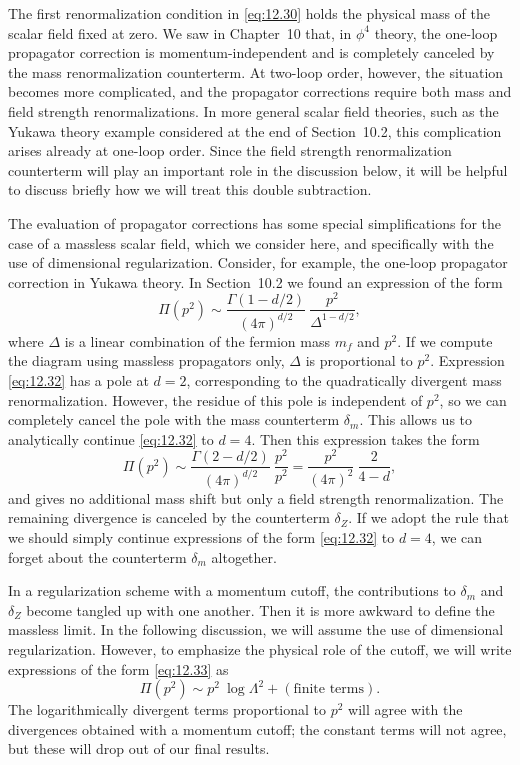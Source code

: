The first renormalization condition in \eqref{eq:12.30} holds the physical
mass of the scalar field fixed at zero.  We saw in Chapter~10 that, in
$\phi^4$ theory, the one-loop propagator correction is momentum-independent
and is completely canceled by the mass renormalization counterterm.  At
two-loop order, however, the situation becomes more complicated, and the
propagator corrections require both mass and field strength
renormalizations.  In more general scalar field theories, such as the Yukawa
theory example considered at the end of Section~10.2, this complication
arises already at one-loop order.  Since the field strength renormalization
counterterm will play an important role in the discussion below, it will be
helpful to discuss briefly how we will treat this double subtraction.

The evaluation of propagator corrections has some special simplifications for
the case of a massless scalar field, which we consider here, and specifically
with the use of dimensional regularization.  Consider, for example, the
one-loop propagator correction in Yukawa theory.  In Section~10.2 we found an
expression of the form
\begin{equation}
  \Pi(p^2) \sim \frac{\Gamma(1-d/2)}{(4\pi)^{d/2}}\ \frac{p^2}{\Delta^{1-d/2}}
  ,
  \label{eq:12.32}
\end{equation}
where $\Delta$ is a linear combination of the fermion mass $m_f$ and $p^2$.
If we compute the diagram using massless propagators only, $\Delta$ is
proportional to $p^2$.  Expression \eqref{eq:12.32} has a pole at $d = 2$,
corresponding to the quadratically divergent mass renormalization.  However,
the residue of this pole is independent of $p^2$, so we can completely cancel
the pole with the mass counterterm $\delta_m$.  This allows us to
analytically continue \eqref{eq:12.32} to $d = 4$.  Then this expression
takes the form
\begin{equation}
  \Pi(p^2) \sim \frac{\Gamma(2-d/2)}{(4\pi)^{d/2}}\ \frac{p^2}{p^2}
  = \frac{p^2}{(4\pi)^2}\ \frac{2}{4-d} ,
  \label{eq:12.33}
\end{equation}
and gives no additional mass shift but only a field strength renormalization.
The remaining divergence is canceled by the counterterm $\delta_Z$.  If we
adopt the rule that we should simply continue expressions of the form
\eqref{eq:12.32} to $d = 4$, we can forget about the counterterm $\delta_m$
altogether.

In a regularization scheme with a momentum cutoff, the contributions to
$\delta_m$ and $\delta_Z$ become tangled up with one another.  Then it is more
awkward to define the massless limit.  In the following discussion, we will
assume the use of dimensional regularization.  However, to emphasize the
physical role of the cutoff, we will write expressions of the form
\eqref{eq:12.33} as
\begin{equation}
  \Pi(p^2) \sim p^2\ \log\Lambda^2 + (\text{finite terms}) .
  \label{eq:12.34}
\end{equation}
The logarithmically divergent terms proportional to $p^2$ will agree with the
divergences obtained with a momentum cutoff; the constant terms will not
agree, but these will drop out of our final results.

